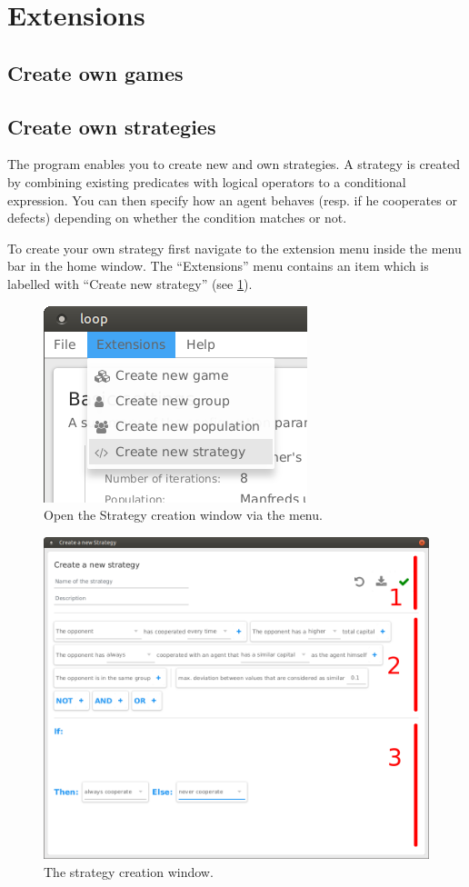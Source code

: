 \documentclass[parskip=full,11pt]{scrartcl}
\begin{document}
\section{Extensions}

\subsection{Create own games}

\subsection{Create own strategies}

The program enables you to create new and own strategies. A strategy is created by combining existing predicates with logical operators to a conditional expression. You can then specify how an agent behaves (resp. if he cooperates or defects) depending on whether the condition matches or not.

To create your own strategy first navigate to the extension menu inside the menu bar in the home window. The \enquote{Extensions} menu contains an item which is labelled with \enquote{Create new strategy} (see \ref{fig:strategy_menu}).

\begin{figure}[h]
	\centering
	\includegraphics[width=0.2\linewidth]{img_manual/strategy_menu.png}
	\caption{Open the Strategy creation window via the menu.}
	\label{fig:strategy_menu}
\end{figure}


\begin{figure}[h]
	\centering
	\includegraphics[width=0.8\linewidth]{img_manual/strategy_window.png}
	\caption{The strategy creation window.}
	\label{fig:strategy_window}
\end{figure}
\end{document}
